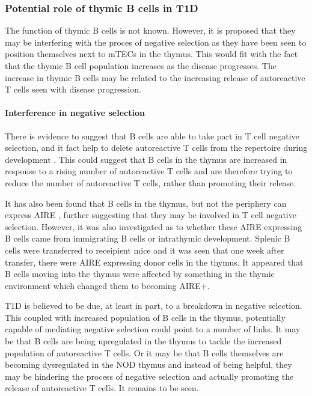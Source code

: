 \subsubsection{Potential role of thymic B cells in T1D}

The function of thymic B cells is not known.
However, it is proposed that they may be interfering with the proces of negative selection as they have been seen to position themselves next to mTECs in the thymus.
This would fit with the fact that the thymic B cell population increases as the disease progresses.
The increase in thymic B cells may be related to the increasing release of autoreactive T cells seen with disease progression.

\paragraph{Interference in negative selection}

There is evidence to suggest that B cells are able to take part in T cell negative selection, and it fact help to delete autoreactive T cells from the repertoire during development \citep{Frommer2010}.
This could suggest that B cells in the thymus are increased in response to a rising number of autoreactive T cells and are therefore trying to reduce the number of autoreactive T cells, rather than promoting their release.

It has also been found that B cells in the thymus, but not the periphery can express AIRE \citep{Yamano2015}, further suggesting that they may be involved in T cell negative selection.
However, it was also investigated as to whether these AIRE expressing B cells came from immigrating B cells or intrathymic development.
Splenic B cells were transferred to receipient mice and it was seen that one week after transfer, there were AIRE expressing donor cells in the thymus.
It appeared that B cells moving into the thymus were affected by something in the thymic environment which changed them to becoming AIRE+.

T1D is believed to be due, at least in part, to a breakdown in negative selection.
This coupled with increased population of B cells in the thymus, potentially capable of mediating negative selection could point to a number of links.
It may be that B cells are being upregulated in the thymus to tackle the increased population of autoreactive T cells.
Or it may be that B cells themselves are becoming dysregulated in the NOD thymus and instead of being helpful, they may be hindering the process of negative selection and actually promoting the release of autoreactive T cells.
It remains to be seen.



